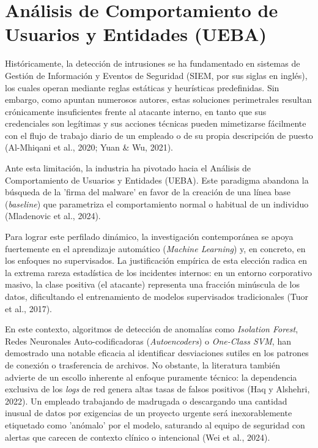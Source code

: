 \documentclass[IB]{TFUOC}%
\begin{document}
\section{Análisis de Comportamiento de Usuarios y Entidades (UEBA)}

Históricamente, la detección de intrusiones se ha fundamentado en sistemas de Gestión de Información y Eventos de Seguridad (SIEM, por sus siglas en inglés), los cuales operan mediante reglas estáticas y heurísticas predefinidas. Sin embargo, como apuntan numerosos autores, estas soluciones perimetrales resultan crónicamente insuficientes frente al atacante interno, en tanto que sus credenciales son legítimas y sus acciones técnicas pueden mimetizarse fácilmente con el flujo de trabajo diario de un empleado o de su propia descripción de puesto (Al-Mhiqani et al., 2020; Yuan \& Wu, 2021).

\medskip
\noindent Ante esta limitación, la industria ha pivotado hacia el Análisis de Comportamiento de Usuarios y Entidades (UEBA). Este paradigma abandona la búsqueda de la 'firma del malware' en favor de la creación de una línea base (\textit{baseline}) que parametriza el comportamiento normal o habitual de un individuo (Mladenovic et al., 2024). 

\medskip
\noindent Para lograr este perfilado dinámico, la investigación contemporánea se apoya fuertemente en el aprendizaje automático (\textit{Machine Learning}) y, en concreto, en los enfoques no supervisados. La justificación empírica de esta elección radica en la extrema rareza estadística de los incidentes internos: en un entorno corporativo masivo, la clase positiva (el atacante) representa una fracción minúscula de los datos, dificultando el entrenamiento de modelos supervisados tradicionales (Tuor et al., 2017). 

\medskip
\noindent En este contexto, algoritmos de detección de anomalías como \textit{Isolation Forest}, Redes Neuronales Auto-codificadoras (\textit{Autoencoders}) o \textit{One-Class SVM}, han demostrado una notable eficacia al identificar desviaciones sutiles en los patrones de conexión o trasferencia de archivos. No obstante, la literatura también advierte de un escollo inherente al enfoque puramente técnico: la dependencia exclusiva de los \textit{logs} de red genera altas tasas de falsos positivos (Haq y Alshehri, 2022). Un empleado trabajando de madrugada o descargando una cantidad inusual de datos por exigencias de un proyecto urgente será inexorablemente etiquetado como 'anómalo' por el modelo, saturando al equipo de seguridad con alertas que carecen de contexto clínico o intencional (Wei et al., 2024). 
\end{document}
